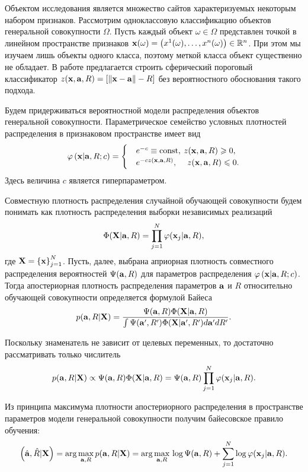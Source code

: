 Объектом исследования является множество сайтов характеризуемых некоторым набором признаков.
Рассмотрим одноклассовую классификацию объектов генеральной совокупности $\Omega$.
Пусть каждый объект $\omega \in{\Omega}$  представлен точкой в линейном пространстве признаков
$\mathbf{x}(\omega)=\left(x^1(\omega),\ldots, x^n(\omega)\right) \in {\mathbb R^n}$. При этом мы изучаем лишь объекты одного класса, поэтому меткой класса объект существенно не обладает. 
В работе \cite{} предлагается строить сферический пороговый классификатор
$z(\mathbf{x},\mathbf{a},R)=\left[\left\|{\mathbf{x}-\mathbf{a}}\right\|-R\right]$ без вероятностного обоснования такого подхода.


Будем придерживаться вероятностной модели распределения объектов генеральной совокупности.
Параметрическое семейство условных плотностей распределения в признаковом пространстве имеет вид 
\begin{equation}
	\label{prob1}
	\varphi \left( {\mathbf{x} | \mathbf{a},R;c} \right) =
		\begin{cases}
			&e^{-c} \equiv \text{const}, \: 	z(\mathbf{x},\mathbf{a},R) \geqslant 0, \\
			&e^{-c z(\mathbf{x},\mathbf{a},R)}, \quad\:	z(\mathbf{x},\mathbf{a},R) \leqslant 0.
		\end{cases} 
\end{equation}
Здесь величина $c$ является гиперпараметром.


Совместную плотность распределения случайной обучающей совокупности будем понимать как плотность распределения выборки независимых реализаций
$$\Phi(\mathbf{X}|\mathbf{a},R)=\prod_{j=1}^N \varphi(\mathbf{x}_j|\mathbf{a},R),$$ 
где $\mathbf{X}=\left\{\mathbf{x}\right\}_{j=1}^N$.
Пусть, далее, выбрана априорная плотность совместного распределения вероятностей $\Psi(\mathbf{a},R)$ для параметров распределения $\varphi \left(\mathbf{x} | \mathbf{a},R;c\right)$. 
Тогда апостериорная плотность распределения параметров $\mathbf{a}$ и $R$ относительно обучающей совокупности определяется формулой Байеса
$$p(\mathbf{a},R|\mathbf{X})
	= \frac {\Psi(\mathbf{a},R) \Phi(\mathbf{X}|\mathbf{a},R)}
			{\int {\Psi(\ensuremath{\mathbf{a}}',R') \Phi(\ensuremath{\mathbf{X}}|\ensuremath{\mathbf{a}}',R')d\ensuremath{\mathbf{a}}'dR'}}.$$

Поскольку знаменатель не зависит от целевых переменных, то достаточно рассматривать только числитель
$$p(\mathbf{a},R|\mathbf{X}) \propto \Psi(\mathbf{a},R) \Phi(\mathbf{X}|\mathbf{a},R) = 
\Psi(\mathbf{a},R) \prod_{j=1}^N \varphi(\mathbf{x}_j|\mathbf{a},R).$$

Из принципа максимума плотности апостериорного распределения в пространстве параметров модели генеральной совокупности получим байесовское правило обучения:
$$\left(\hat{\mathbf{a}},\hat R|\mathbf{X}\right)
	= \arg\underset{\mathbf{a},R}\max\, p(\mathbf{a},R|\mathbf{X}) 
	= \arg\underset{\mathbf{a},R}\max\, \log\Psi(\mathbf{a},R) + \sum_{j=1}^N\log\varphi(\mathbf{x}_j|\mathbf{a},R). $$




